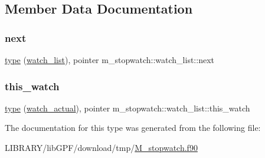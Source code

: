 \subsection{Member Data Documentation}
\mbox{\label{structm__stopwatch_1_1watch__list_a898fce86de28e07bf5f627baf40f35f0}} 
\subsubsection{\texorpdfstring{next}{next}}
{\footnotesize\ttfamily \hyperlink{stop__watch_83_8txt_a70f0ead91c32e25323c03265aa302c1c}{type} (\hyperlink{structm__stopwatch_1_1watch__list}{watch\+\_\+list}), pointer m\+\_\+stopwatch\+::watch\+\_\+list\+::next\hspace{0.3cm}{\ttfamily [private]}}

\mbox{\label{structm__stopwatch_1_1watch__list_ac8234d58cf4e9e41c2debff4c807f461}} 
\subsubsection{\texorpdfstring{this\+\_\+watch}{this\_watch}}
{\footnotesize\ttfamily \hyperlink{stop__watch_83_8txt_a70f0ead91c32e25323c03265aa302c1c}{type} (\hyperlink{structm__stopwatch_1_1watch__actual}{watch\+\_\+actual}), pointer m\+\_\+stopwatch\+::watch\+\_\+list\+::this\+\_\+watch\hspace{0.3cm}{\ttfamily [private]}}



The documentation for this type was generated from the following file\+:\begin{DoxyCompactItemize}
\item 
L\+I\+B\+R\+A\+R\+Y/lib\+G\+P\+F/download/tmp/\hyperlink{M__stopwatch_8f90}{M\+\_\+stopwatch.\+f90}\end{DoxyCompactItemize}
